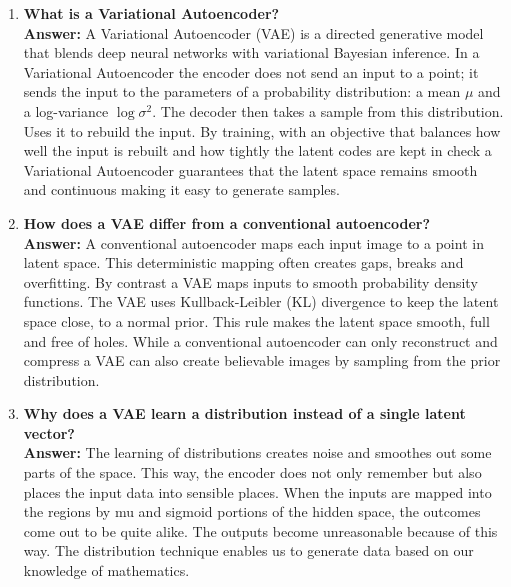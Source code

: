 \documentclass[10pt]{article}
\begin{document}
\begin{enumerate}
\vspace{5mm}

\item \textbf{What is a Variational Autoencoder?}\\[1.5mm]
\textbf{Answer:} A Variational Autoencoder (VAE) is a directed generative model that blends deep neural networks with variational Bayesian inference. In a Variational Autoencoder the encoder does not send an input to a point; it sends the input to the parameters of a probability distribution: a mean $ \mu $ and a log-variance $ \log\sigma^2 $. The decoder then takes a sample from this distribution. Uses it to rebuild the input. By training, with an objective that balances how well the input is rebuilt and how tightly the latent codes are kept in check a Variational Autoencoder guarantees that the latent space remains smooth and continuous making it easy to generate samples.

\vspace{5mm}

\item \textbf{How does a VAE differ from a conventional autoencoder?}\\[1.5mm]
\textbf{Answer:} A conventional autoencoder maps each input image to a point in latent space. This deterministic mapping often creates gaps, breaks and overfitting. By contrast a VAE maps inputs to smooth probability density functions. The VAE uses Kullback‑Leibler (KL) divergence to keep the latent space close, to a normal prior. This rule makes the latent space smooth, full and free of holes. While a conventional autoencoder can only reconstruct and compress a VAE can also create believable images by sampling from the prior distribution.

\vspace{5mm}

\item \textbf{Why does a VAE learn a distribution instead of a single latent vector?}\\[1.5mm]
\textbf{Answer:} The learning of distributions creates noise and smoothes out some parts of the space. This way, the encoder does not only remember but also places the input data into sensible places. When the inputs are mapped into the regions by mu and sigmoid portions of the hidden space, the outcomes come out to be quite alike. The outputs become unreasonable because of this way. The distribution technique enables us to generate data based on our knowledge of mathematics.

\vspace{5mm}


\end{enumerate}
\end{document}

